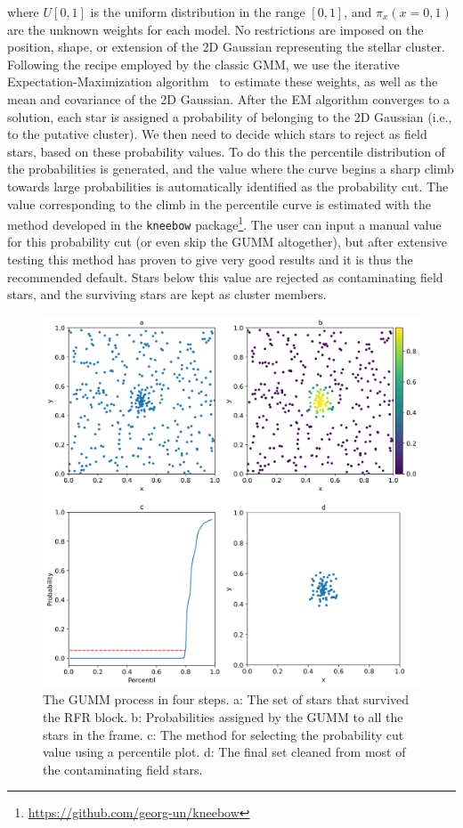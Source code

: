 \documentclass[draft]{aa}
\begin{document}
 \noindent where $U[0,1]$ is the uniform distribution in the range $[0,1]$,
 and $\pi_{x} (x=0,1)$ are the unknown weights for each model.
 No restrictions are imposed on the position, shape, or
 extension of the 2D Gaussian representing the stellar cluster.
 Following the recipe employed by the classic GMM, we use the
 iterative Expectation-Maximization algorithm~\citep[EM,][]{dempster_1977} to
 estimate these  weights, as well as the mean and covariance of the 2D
 Gaussian. After the EM algorithm converges to a solution, each star is
 assigned a probability of belonging to the 2D Gaussian 
 (i.e., to the putative cluster). We then need to decide which stars to reject
 as field stars, based on these probability values. To do this the percentile
 distribution of the probabilities is generated, and the value
 where the curve begins a sharp climb towards large probabilities is
 automatically identified as the probability cut. The value
 corresponding to the climb in the percentile curve is estimated with the
 method developed in the \texttt{kneebow} package\footnote{
 \url{https://github.com/georg-un/kneebow}}. The user can input a
 manual value for this probability cut (or even skip the GUMM altogether), but
 after extensive testing this method has proven to give very good results and
 it is thus the recommended default.
 Stars below this value are rejected as contaminating field stars, and the
 surviving stars are kept as cluster members.

 \begin{figure}
 \includegraphics[width=\hsize]{figs/GUMM.png}
 \caption{The GUMM process in four steps. a: The set of stars that survived
 the RFR block. b: Probabilities assigned by the GUMM to all the stars in the
 frame. c: The method for selecting the probability cut value using a
 percentile plot. d: The final set cleaned from most of the contaminating
 field stars.}
 \label{fig:gumm}
 \end{figure}
\end{document}
